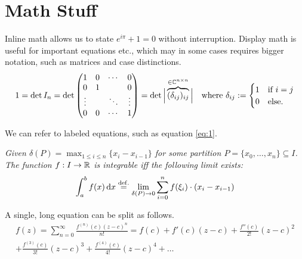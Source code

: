 \section{Math Stuff}

Inline math allows us to state $e^{i\pi} + 1 = 0$ without interruption.
Display math is useful for important equations etc., which may in some cases requires bigger notation, such as matrices and case distinctions.
\[
	1
	= \det I_n
	= \det\begin{pmatrix}
	1      & 0 & \cdots & 0      \\
	0      & 1 &        & 0      \\
	\vdots &   & \ddots & \vdots \\
	0      & 0 & \cdots & 1      \\
	\end{pmatrix}
	= \det\Big|\overbrace{ (\delta_{ij})_{ij} }^{\in\C^{n\times n}}\Big|
	\quad\text{where}\ \delta_{ij}
	:= \begin{cases} %
		1 & \text{if $i = j$} \\ 0 & \text{else.}
	\end{cases}
\]

We can refer to labeled equations, such as equation \eqref{eq:1}.

\textit{Given $\delta(P) = \max_{1\leq i\leq n}\{x_i-x_{i-1}\}$ for some partition $P = \{x_0,\dots,x_n\}\subseteq I$.
The function $f:I\to\mathbb{R}$ is integrable iff the following limit exists:}
\begin{equation}\label{eq:1}
	\int_a^b f(x) \,\mathrm{d} x \stackrel{\mathrm{def.}}{=} \lim_{\delta(P)\to0} \sum_{i=0}^n f(\xi_i)\cdot(x_i - x_{i-1})
\end{equation}

A single, long equation can be split as follows.
\begin{multline*}
	f(z)
	= \sum_{n=0}^\infty \frac{f^{(n)}(c) (z-c)^n}{n!}
	= f(c) + f'(c)(z-c) + \frac{f''(c)}{2!}(z-c)^2 \\
	+ \frac{f^{(3)}(c)}{3!}(z-c)^3 + \frac{f^{(4)}(c)}{4!}(z-c)^4 + \dots
\end{multline*}

